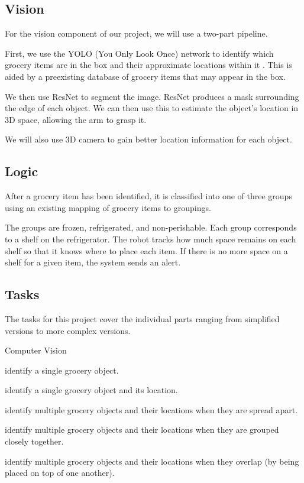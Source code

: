 \documentclass{article}
\begin{document}
\subsection{Vision}
For the vision component of our project, we will use a two-part pipeline.

First, we use the YOLO (You Only Look Once) network to identify which grocery items are in the box and their approximate locations within it \cite{DBLP:journals/corr/RedmonDGF15}. This is aided by a preexisting database of grocery items that may appear in the box.

We then use ResNet \cite{10.1145/3164541.3164628} to segment the image. ResNet produces a mask surrounding the edge of each object. We can then use this to estimate the object's location in 3D space, allowing the arm to grasp it.

We will also use 3D camera to gain better location information for each object.

\subsection{Logic}

After a grocery item has been identified, it is classified into one of three groups using an existing mapping of grocery items to groupings.

The groups are frozen, refrigerated, and non-perishable. Each group corresponds to a shelf on the refrigerator. The robot tracks how much space remains on each shelf so that it knows where to place each item. If there is no more space on a shelf for a given item, the system sends an alert.


\subsection{Tasks}


The tasks for this project cover the individual parts ranging from simplified versions to more complex versions.


Computer Vision
\begin{itemize}
    \item identify a single grocery object.
    \item identify a single grocery object and its location.
    \item identify multiple grocery objects and their locations when they are spread apart.
    \begin{sloppypar}
    \item identify multiple grocery objects and their locations when they are grouped closely together.
    \end{sloppypar}
    \item identify multiple grocery objects and their locations when they overlap (by being placed on top of one another).
\end{itemize}
\end{document}
